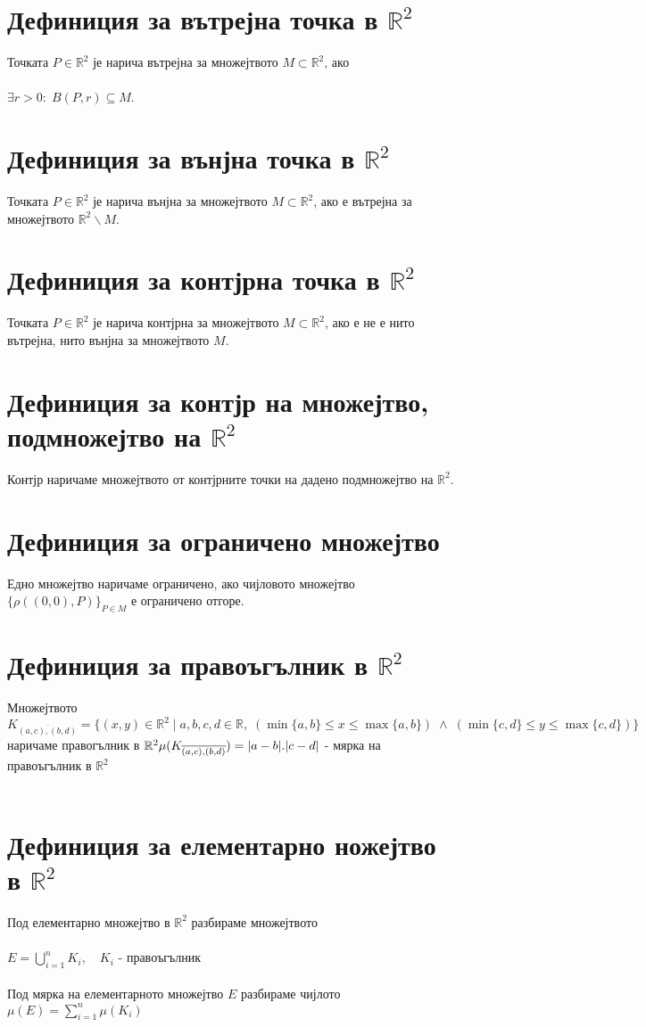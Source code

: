 \documentclass[14pt]{extarticle}
\newcommand{\R}{\mathbb{R}}
\newcommand{\Sum}{\displaystyle\sum}
\begin{document}
\section*{Дефиниция за вътрејна точка в \(\R^2\)}
Точката \(P \in \R^2\) је нарича вътрејна за множејтвото \(M \subset \R^2\), ако \\\\
\(\exists r > 0 : \; B(P,r) \subseteq M\).
\section*{Дефиниция за вънјна точка в \(\R^2\)}
Точката \(P \in \R^2\) је нарича вънјна за множејтвото \(M \subset \R^2\), ако е вътрејна за множејтвото \(\R^2\backslash M\).
\section*{Дефиниция за контјрна точка в \(\R^2\)}
Точката \(P \in \R^2\) је нарича контјрна за множејтвото \(M \subset \R^2\), ако е не е нито вътрејна, нито вънјна за множејтвото \(M\).
\section*{Дефиниция за контјр на множејтво, подмножејтво на \(\R^2\)}
Контјр наричаме множејтвото от контјрните точки на дадено подмножејтво на \(\R^2\).
\section*{Дефиниция за ограничено множејтво}
Едно множејтво наричаме ограничено, ако чијловото множејтво \(\{\rho((0, 0), P)\}_{P \in M}\) е ограничено отгоре.
\section*{Дефиниция за правоъгълник в \(\R^2\)}
Множејтвото \(K_{\overline{(a, c), (b, d)}} = \{(x, y) \in \R^2 \; | \; a, b, c, d \in \R, \;  (\min\{a, b\} \leq x \leq \max\{a, b\}) \; \land \; (\min\{c, d\} \leq y \leq \max\{c, d\}) \}\) наричаме правогълник в \(\R^2 \\\\
\mu(K_{\overline{(a, c), (b, d)}}) = |a - b|.|c - d|\) - мярка на правоъгълник в \(\R^2\) \\\\
\section*{Дефиниция за елементарно ножејтво в \(\R^2\)}
Под елементарно множејтво в \(\R^2\) разбираме множејтвото \\\\
\(E = \bigcup_{i = 1}^n K_i, \quad K_i\) - правоъгълник \\\\
Под мярка на елементарното множејтво \(E\) разбираме чијлото \(\mu(E) = \Sum_{i = 1}^n \mu(K_i)\)
\end{document}
